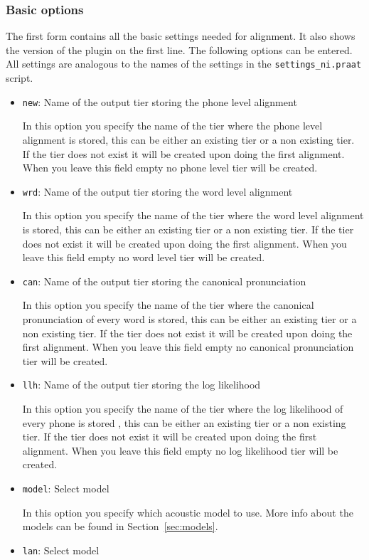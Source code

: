 \subsubsection{Basic options}	
The first form contains all the basic settings needed for alignment. It also
shows the version of the plugin on the first line. The following options can be
entered. All settings are analogous to the names of the settings in the
\texttt{settings\_ni.praat} script.
\begin{itemize}
	\item \texttt{new}: %
		Name of the output tier storing the phone level alignment

		In this option you specify the name of the tier where the phone level
		alignment is stored, this can be either an existing tier or a non existing
		tier. If the tier does not exist it will be created upon doing the first
		alignment. When you leave this field empty no phone level tier will be
		created.
	\item \texttt{wrd}: %
		Name of the output tier storing the word level alignment

		In this option you specify the name of the tier where the word level
		alignment is stored, this can be either an existing tier or a non existing
		tier. If the tier does not exist it will be created upon doing the first
		alignment. When you leave this field empty no word level tier will be
		created.
	\item \texttt{can}: %
		Name of the output tier storing the canonical pronunciation

		In this option you specify the name of the tier where the canonical
		pronunciation of every word is stored, this can be either an existing tier
		or a non existing tier. If the tier does not exist it will be created upon
		doing the first alignment. When you leave this field empty no canonical
		pronunciation tier will be created.
	\item \texttt{llh}: %
		Name of the output tier storing the log likelihood

		In this option you specify the name of the tier where the log likelihood of
		every phone is stored , this can be either an existing tier or a non
		existing tier. If the tier does not exist it will be created upon doing the
		first alignment. When you leave this field empty no log likelihood tier
		will be created.
	\item \texttt{model}: %
		Select model

		In this option you specify which acoustic model to use. More info about the
		models can be found in Section~\ref{sec:models}.
	\item \texttt{lan}: %
		Select model


\end{itemize}
